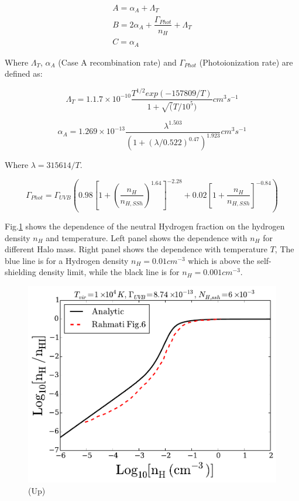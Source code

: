 \documentclass[a4,useAMS,usenatbib,usegraphicx]{mn2e}
\begin{document}
\begin{equation}
\begin{split}
A = \alpha_A + \Lambda_T \\
B = 2\alpha_A + \dfrac{\Gamma_{Phot}}{n_H} + \Lambda_T \\
C = \alpha_A
\end{split}
\end{equation}

Where $\Lambda_T$, $\alpha_A$ (Case A recombination rate) and
$\Gamma_{Phot}$ (Photoionization rate) are defined as:

\begin{equation}
\Lambda_T = 1.1.7 \times 10 ^{-10} \dfrac{T^{1/2} exp(-157809/T)}{1 + \sqrt(T/10^5)} cm^3 s^{-1}
\end{equation}


\begin{equation}
\alpha_A = 1.269 \times 10 ^{-13} \dfrac{\lambda^{1.503}}{(1 + (\lambda / 0.522)^{0.47} )^{1.923}} cm^{3} s^{-1}
\end{equation}

Where $\lambda = 315614 / T$.

\begin{equation}
\Gamma_{Phot} = \Gamma_{UVB} \left(  0.98\left[ 1 + \left( \dfrac{n_H}{n_{H, SSh}} \right)^{1.64}  \right]^{-2.28} + 0.02 \left[ 1 + \dfrac{n_H}{n_{H,SSh}} \right]^{-0.84}   \right)
\end{equation}

Fig.\ref{fig:eta} shows the dependence of the neutral Hydrogen
fraction on the hydrogen density $n_H$ and temperature. Left panel
shows the dependence with $n_H$ for different Halo mass. Right panel
shows the dependence with temperature $T$, The blue
line is for a Hydrogen density $n_H = 0.01 cm^{-3}$
which is above the self-shielding density limit, while the black line is for $n_H  = 0.001 cm^{-3}$.

\begin{figure}
\centering
\includegraphics[scale=0.5]{../figures/nhvseta.pdf}
\caption{(Up)\label{fig:eta}}
\end{figure}
\end{document}
